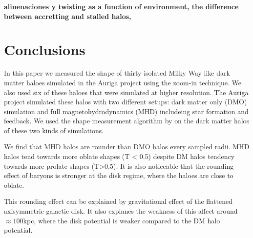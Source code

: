 \documentclass[a4paper,fleqn,usenatbib]{mnras}
\begin{document}
{{\bf alinenaciones y twisting as a function of environment, 
the difference between accretting and stalled halos, }





\section{Conclusions}

In this paper we measured the shape of thirty isolated Milky Way like 
dark matter haloes simulated in the Auriga project using the zoom-in
technique. 
We also used six of these haloes that were simulated at higher
resolution. 
The Auriga project simulated these halos with two different setups:
dark matter only (DMO) simulation and full magnetohydrodynamics (MHD)
includeing star formation and feedback.
We used the shape measurement algorithm by \cite{Allgood06} on the
dark matter halos of these two kinds of simulations.

We find that MHD halos are rounder than DMO halos every sampled radii. 
MHD halos tend towards more oblate shapes (T < 0.5)
despite DM halos tendency towards more prolate shapes (T>0.5). 
It is also noticeable that the rounding effect of baryons is stronger
at the disk regime, where the haloes are close to oblate.

This rounding effect can be explained by gravitational effect of the
flattened axisymmetric galactic disk. 
It also explanes the weakness of this affect around $\approx 100$kpc,
where the disk potential is weaker compared to the DM halo potential. 

}
\end{document}
